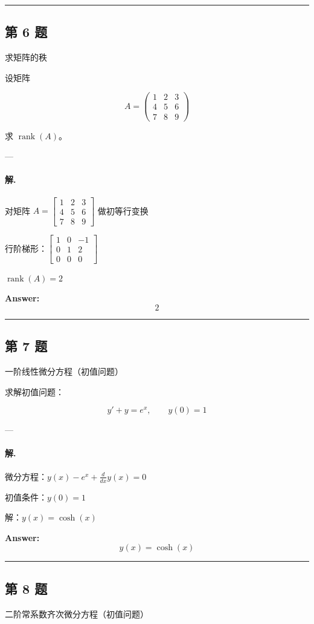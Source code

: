 \documentclass[12pt, a4paper]{ctexart}
\newcommand{\problem}[1]{\subsection*{第 #1 题}}
\newcommand{\solution}{\paragraph{解.}}
\begin{document}
\vspace{1em}
\hrule
\vspace{1em}

\problem{6}

求矩阵的秩

设矩阵

$$
A = \begin{pmatrix} 1 & 2 & 3 \\ 4 & 5 & 6 \\ 7 & 8 & 9 \end{pmatrix}
$$

求 $\operatorname{rank}(A)$。

---

\solution

对矩阵 $A = \begin{bmatrix}1 & 2 & 3 \\ 4 & 5 & 6 \\ 7 & 8 & 9\end{bmatrix}$ 做初等行变换

行阶梯形：$\left[\begin{matrix}1 & 0 & -1\\0 & 1 & 2\\0 & 0 & 0\end{matrix}\right]$

$\operatorname{rank}(A) = 2$

\textbf{Answer:}
\[\boxed{2}\]

\vspace{1em}
\hrule
\vspace{1em}

\problem{7}

一阶线性微分方程（初值问题）

求解初值问题：

$$
y' + y = e^{x}, \qquad y(0) = 1
$$

---

\solution

微分方程：$y{\left(x \right)} - e^{x} + \frac{d}{d x} y{\left(x \right)} = 0$

初值条件：$y{\left(0 \right)} = 1$

解：$y(x) = \cosh{\left(x \right)}$

\textbf{Answer:}
\[\boxed{y(x) = \cosh{\left(x \right)}}\]

\vspace{1em}
\hrule
\vspace{1em}

\problem{8}

二阶常系数齐次微分方程（初值问题）
\end{document}

